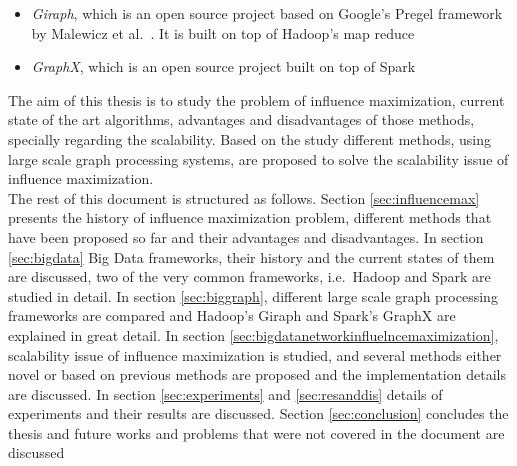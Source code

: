 \documentclass[english]{tktltiki}
\begin{document}
\begin{itemize}
\item 
\textit{Giraph}, which is an open source project based on Google's Pregel framework by Malewicz et al.\ \cite{malewicz10}. It is built on top of Hadoop's map reduce
\item 
\textit{GraphX}, which is an open source project built on top of Spark
\end{itemize}
The aim of this thesis is to study the problem of influence maximization, current state of the art algorithms, advantages and disadvantages of those methods, specially regarding the scalability. Based on the study different methods, using large scale graph processing systems, are proposed to solve the scalability issue of influence maximization. \\
The rest of this document is structured as follows. Section \ref{sec:influencemax} presents the history of influence maximization problem, different methods that have been proposed so far and their advantages and disadvantages. In section \ref{sec:bigdata} Big Data frameworks, their history and the current states of them are discussed, two of the very common frameworks, i.e.\ Hadoop and Spark are studied in detail. In section \ref{sec:biggraph}, different large scale graph processing frameworks are compared and Hadoop's Giraph and Spark's GraphX are explained in great detail. In section \ref{sec:bigdatanetworkinfluelncemaximization}, scalability issue of influence maximization is studied, and several methods either novel or based on previous methods are proposed and the implementation details are discussed. In section \ref{sec:experiments} and \ref{sec:resanddis} details of experiments and their results are discussed. Section \ref{sec:conclusion} concludes the thesis and future works and problems that were not covered in the document are discussed


\newpage
\end{document}
